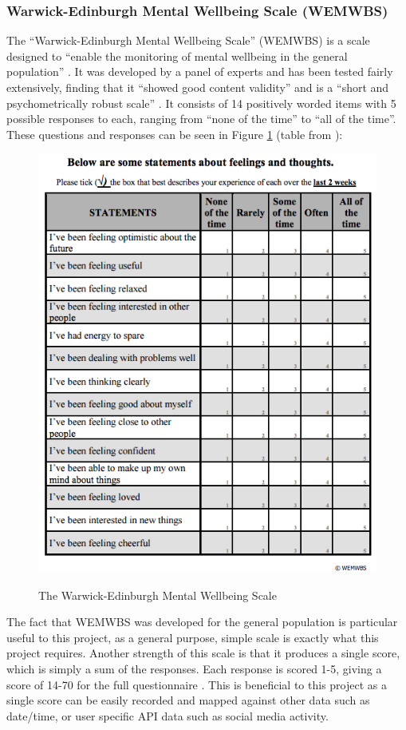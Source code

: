 \documentclass[11pt,openright,a4paper]{report}
\begin{document}
\subsubsection{Warwick-Edinburgh Mental Wellbeing Scale (WEMWBS)}
The \enquote{Warwick-Edinburgh Mental Wellbeing Scale} (WEMWBS) is a scale designed to \enquote{enable the monitoring of mental wellbeing in the general population} \parencite{wemwbs}. It was developed by a panel of experts \parencite{wemwbsdevelopment} and has been tested fairly extensively, finding that it \enquote{showed good content validity} and is a \enquote{short and psychometrically robust scale} \parencite{tennant2007warwick}. It consists of 14 positively worded items with 5 possible responses to each, ranging from \enquote{none of the time} to \enquote{all of the time}.
\newpage
These questions and responses can be seen in Figure \ref{fig:wemwbs} (table from \parencite{wemwbsquestions}):
\begin{figure}[ht]
\centering
\caption{The Warwick-Edinburgh Mental Wellbeing Scale}
\includegraphics[width=.8\textwidth]{i/wemwbs.png}
\label{fig:wemwbs}
\end{figure}

The fact that WEMWBS was developed for the general population is particular useful to this project, as a general purpose, simple scale is exactly what this project requires. Another strength of this scale is that it produces a single score, which is simply a sum of the responses. Each response is scored 1-5, giving a score of 14-70 for the full questionnaire \parencite{wemwbsscoring}. This is beneficial to this project as a single score can be easily recorded and mapped against other data such as date/time, or user specific API data such as social media activity.
\end{document}
